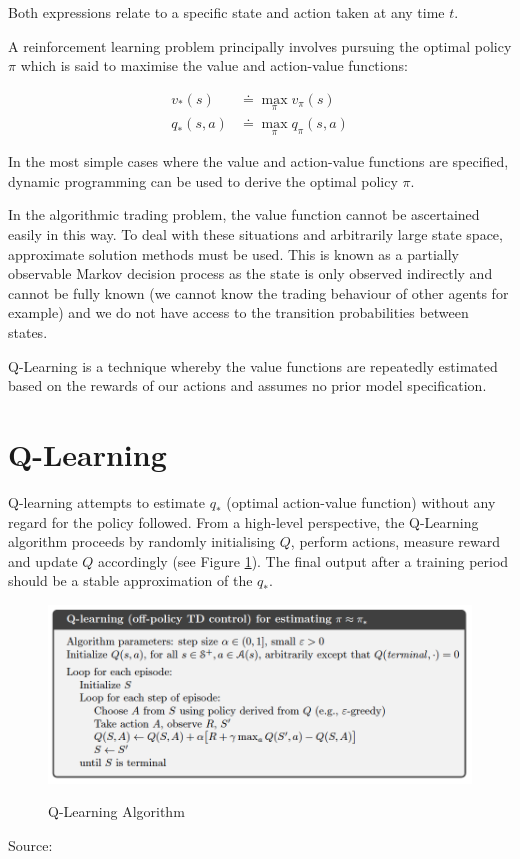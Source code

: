 \documentclass[12pt, authoryear]{elsarticle}
\begin{document}
Both expressions relate to a specific state and action taken at any time $t$.

A reinforcement learning problem principally involves pursuing the optimal policy $\pi$ which is said to maximise the value and action-value functions:

$$
\begin{aligned}
v _ { * } ( s ) &\doteq \max _ { \pi } v _ { \pi } ( s )\\
q _ { * } ( s , a ) &\doteq \max _ { \pi } q _ { \pi } ( s , a )
\end{aligned}
$$

In the most simple cases where the value and action-value functions are specified, dynamic programming can be used to derive the optimal policy $\pi$.

In the algorithmic trading problem, the value function cannot be ascertained easily in this way. To deal with these situations and arbitrarily large state space, approximate solution methods must be used. This is known as a partially observable Markov decision process as the state is only observed indirectly and cannot be fully known (we cannot know the trading behaviour of other agents for example) and we do not have access to the transition probabilities between states.

Q-Learning is a technique whereby the value functions are repeatedly estimated based on the rewards of our actions and assumes no prior model specification.

\section{Q-Learning} 

Q-learning attempts to estimate $q_{*}$ (optimal action-value function) without any regard for the policy followed. From a high-level perspective, the Q-Learning algorithm proceeds by randomly initialising $Q$, perform actions, measure reward and update $Q$ accordingly (see Figure \ref{fig:ql}). The final output after a training period should be a stable approximation of the $q_{*}$.

\begin{figure}[h!]
	\centering
	\caption{Q-Learning Algorithm}
	\includegraphics[clip, angle=0, width=13cm]{figures/psudo_code.png}
	\label{fig:ql}
\end{figure}
\begin{center}
	{Source: \cite{sutton1998introduction}}
\end{center}
\end{document}
